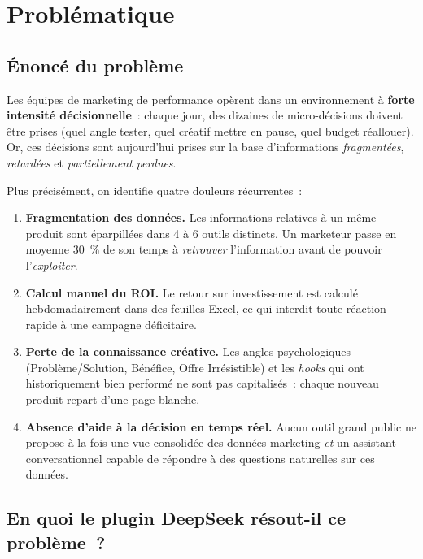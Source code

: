 \section{Problématique}
\label{sec:problematique}

\subsection{Énoncé du problème}

Les équipes de marketing de performance opèrent dans un environnement à
\textbf{forte intensité décisionnelle}~: chaque jour, des dizaines de
micro-décisions doivent être prises (quel angle tester, quel créatif mettre
en pause, quel budget réallouer). Or, ces décisions sont aujourd'hui prises
sur la base d'informations \emph{fragmentées}, \emph{retardées} et
\emph{partiellement perdues}.

Plus précisément, on identifie quatre douleurs récurrentes~:

\begin{enumerate}
    \item \textbf{Fragmentation des données.} Les informations relatives
    à un même produit sont éparpillées dans 4 à 6 outils distincts. Un
    marketeur passe en moyenne 30~\% de son temps à \emph{retrouver}
    l'information avant de pouvoir l'\emph{exploiter}.

    \item \textbf{Calcul manuel du ROI.} Le retour sur investissement est
    calculé hebdomadairement dans des feuilles Excel, ce qui interdit toute
    réaction rapide à une campagne déficitaire.

    \item \textbf{Perte de la connaissance créative.} Les angles
    psychologiques (Problème/Solution, Bénéfice, Offre Irrésistible) et les
    \emph{hooks} qui ont historiquement bien performé ne sont pas
    capitalisés~: chaque nouveau produit repart d'une page blanche.

    \item \textbf{Absence d'aide à la décision en temps réel.} Aucun outil
    grand public ne propose à la fois une vue consolidée des données
    marketing \emph{et} un assistant conversationnel capable de répondre à
    des questions naturelles sur ces données.
\end{enumerate}

\subsection{En quoi le plugin DeepSeek résout-il ce problème~?}

